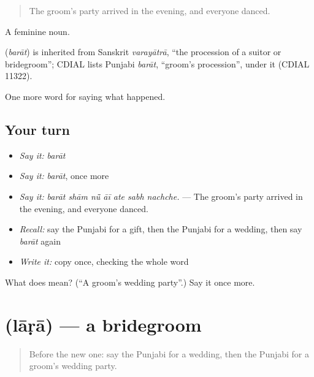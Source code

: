 \begin{quote}
The groom's party arrived in the evening, and everyone danced.
\end{quote}

A feminine noun.

\begin{cousinweb}
\textbf{} (\emph{barāt}) is inherited from Sanskrit \emph{varayātrā}, \textquotedblleft{}the procession of a suitor or bridegroom\textquotedblright{}; CDIAL lists Punjabi \emph{barāt}, \textquotedblleft{}groom's procession\textquotedblright{}, under it (CDIAL 11322).
\end{cousinweb}

\begin{grammarlens}[title={What you've built}]
One more word for saying what happened.
\end{grammarlens}

\subsection*{Your turn}
\begin{itemize}
\raggedright
  \item \emph{Say it:} \emph{barāt}
  \item \emph{Say it:} \emph{barāt}, once more
  \item \emph{Say it:} \emph{barāt shām nū̃ āī ate sabh nachche.} — The groom's party arrived in the evening, and everyone danced.
  \item \emph{Recall:} say the Punjabi for a gift, then the Punjabi for a wedding, then say \emph{barāt} again
  \item \emph{Write it:} copy \textbf{} once, checking the whole word
\end{itemize}

\begin{tcolorbox}[breakable,colback=teal!4,colframe=teal!35!black,title={Before you move on}]
What does  mean? (\textquotedblleft{}A groom's wedding party\textquotedblright{}.) Say it once more.
\end{tcolorbox}
\section[\texorpdfstring{\pa{ਲਾੜਾ} (lāṛā)}{ਲਾੜਾ (lāṛā)}]{ (lāṛā) — a bridegroom}

\label{lesson:PA-C313-lara}



\begin{quote}
Before the new one: say the Punjabi for a wedding, then the Punjabi for a groom's wedding party.
\end{quote}

